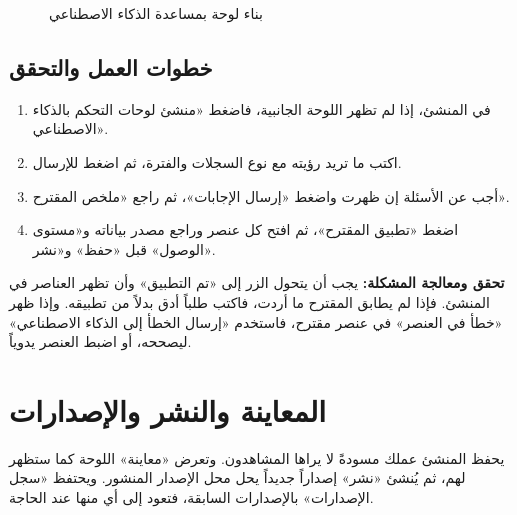 \begin{figure}[H]
\centering
{}
\rclegend
\caption{بناء لوحة بمساعدة الذكاء الاصطناعي}
\label{fig:builder-dashboards-ai-builder-flow}
\end{figure}

\subsection{خطوات العمل والتحقق}
\begin{enumerate}
\item في المنشئ، إذا لم تظهر اللوحة الجانبية، فاضغط «منشئ لوحات التحكم بالذكاء الاصطناعي».
\item اكتب ما تريد رؤيته مع نوع السجلات والفترة، ثم اضغط  للإرسال.
\item أجب عن الأسئلة إن ظهرت واضغط «إرسال الإجابات»، ثم راجع «ملخص المقترح».
\item اضغط «تطبيق المقترح»، ثم افتح كل عنصر وراجع مصدر بياناته و«مستوى الوصول» قبل «حفظ» و«نشر».
\end{enumerate}

\textbf{تحقق ومعالجة المشكلة:} يجب أن يتحول الزر إلى «تم التطبيق» وأن تظهر العناصر في المنشئ. فإذا لم يطابق المقترح ما أردت، فاكتب طلباً أدق بدلاً من تطبيقه. وإذا ظهر «خطأ في العنصر» في عنصر مقترح، فاستخدم «إرسال الخطأ إلى الذكاء الاصطناعي» ليصححه، أو اضبط العنصر يدوياً.

\clearpage
\section{المعاينة والنشر والإصدارات}
\label{sec:builder-feature-dashboards-publish}

يحفظ المنشئ عملك مسودةً لا يراها المشاهدون. وتعرض «معاينة» اللوحة كما ستظهر لهم، ثم يُنشئ «نشر» إصداراً جديداً يحل محل الإصدار المنشور. ويحتفظ «سجل الإصدارات» بالإصدارات السابقة، فتعود إلى أي منها عند الحاجة.

